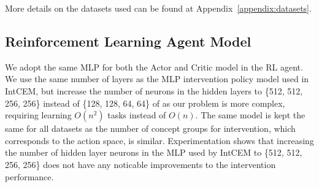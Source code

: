More details on the datasets used can be found at Appendix~\ref{appendix:datasets}.

\subsection{Reinforcement Learning Agent Model}
We adopt the same MLP for 
both the Actor and Critic model in the RL agent. 
We use the same number of layers as the MLP intervention policy
 model used in IntCEM, but increase the number of neurons in the hidden layers
 to \{512, 512, 256, 256\} instead of \{128, 128, 64, 64\}
 of as 
 our problem is more complex, requiring 
 learning $O(n^2)$ tasks instead of $O(n)$.
 The same model is kept 
 the same for all datasets as the number of concept groups for intervention,
 which corresponds to the action space,
 is similar. Experimentation shows that increasing the number of hidden layer neurons
 in the MLP used by 
 IntCEM to \{512, 512, 256, 256\} does not have any noticable improvements
 to the intervention performance.
